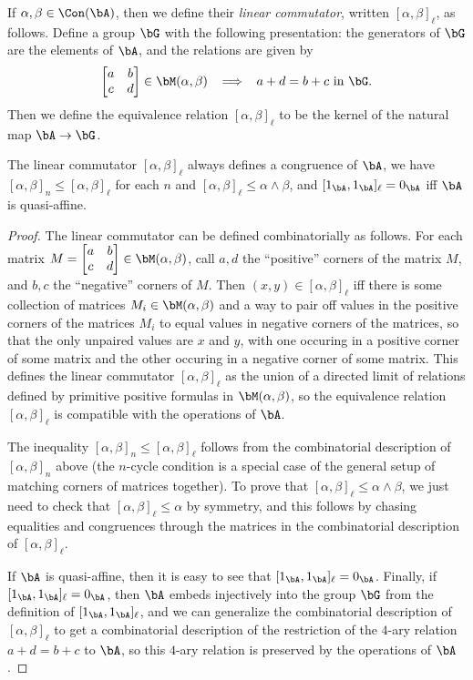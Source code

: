 \begin{defn} If $\alpha, \beta \in \Con(\bA)$, then we define their \emph{linear commutator}, written $[\alpha,\beta]_\ell$, as follows. Define a group $\bG$ with the following presentation: the generators of $\bG$ are the elements of $\bA$, and the relations are given by
\[
\begin{bmatrix} a & b\\ c & d\end{bmatrix} \in \bM(\alpha, \beta) \;\; \implies \;\; a+d = b+c \text{ in } \bG.
\]
Then we define the equivalence relation $[\alpha,\beta]_\ell$ to be the kernel of the natural map $\bA \rightarrow \bG$.
\end{defn}

\begin{prop} The linear commutator $[\alpha,\beta]_\ell$ always defines a congruence of $\bA$, we have $[\alpha,\beta]_n \le [\alpha,\beta]_\ell$ for each $n$ and $[\alpha,\beta]_\ell \le \alpha \wedge \beta$, and $[1_\bA,1_\bA]_\ell = 0_\bA$ iff $\bA$ is quasi-affine.
\end{prop}
\begin{proof} The linear commutator can be defined combinatorially as follows. For each matrix $M = \begin{bmatrix} a & b\\ c & d\end{bmatrix} \in \bM(\alpha, \beta)$, call $a,d$ the ``positive'' corners of the matrix $M$, and $b,c$ the ``negative'' corners of $M$. Then $(x,y) \in [\alpha,\beta]_\ell$ iff there is some collection of matrices $M_i \in \bM(\alpha, \beta)$ and a way to pair off values in the positive corners of the matrices $M_i$ to equal values in negative corners of the matrices, so that the only unpaired values are $x$ and $y$, with one occuring in a positive corner of some matrix and the other occuring in a negative corner of some matrix. This defines the linear commutator $[\alpha,\beta]_\ell$ as the union of a directed limit of relations defined by primitive positive formulas in $\bM(\alpha,\beta)$, so the equivalence relation $[\alpha, \beta]_\ell$ is compatible with the operations of $\bA$.

The inequality $[\alpha,\beta]_n \le [\alpha,\beta]_\ell$ follows from the combinatorial description of $[\alpha,\beta]_n$ above (the $n$-cycle condition is a special case of the general setup of matching corners of matrices together). To prove that $[\alpha,\beta]_\ell \le \alpha \wedge \beta$, we just need to check that $[\alpha,\beta]_\ell \le \alpha$ by symmetry, and this follows by chasing equalities and congruences through the matrices in the combinatorial description of $[\alpha,\beta]_\ell$.

If $\bA$ is quasi-affine, then it is easy to see that $[1_\bA,1_\bA]_\ell = 0_\bA$. Finally, if $[1_\bA,1_\bA]_\ell = 0_\bA$, then $\bA$ embeds injectively into the group $\bG$ from the definition of $[1_\bA,1_\bA]_\ell$, and we can generalize the combinatorial description of $[\alpha,\beta]_\ell$ to get a combinatorial description of the restriction of the $4$-ary relation $a+d = b+c$ to $\bA$, so this $4$-ary relation is preserved by the operations of $\bA$.
\end{proof}

